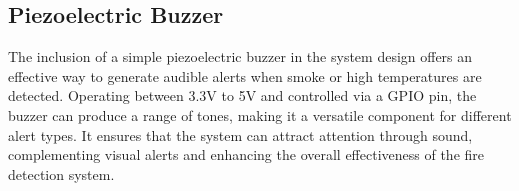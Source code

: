 \subsection{Piezoelectric Buzzer}

The inclusion of a simple piezoelectric buzzer in the system design offers an effective way to generate audible alerts
when smoke or high temperatures are detected. Operating between 3.3V to 5V and controlled via a GPIO pin, the buzzer
can produce a range of tones, making it a versatile component for different alert types. It ensures that the system can
attract attention through sound, complementing visual alerts and enhancing the overall effectiveness of the fire
detection system.
